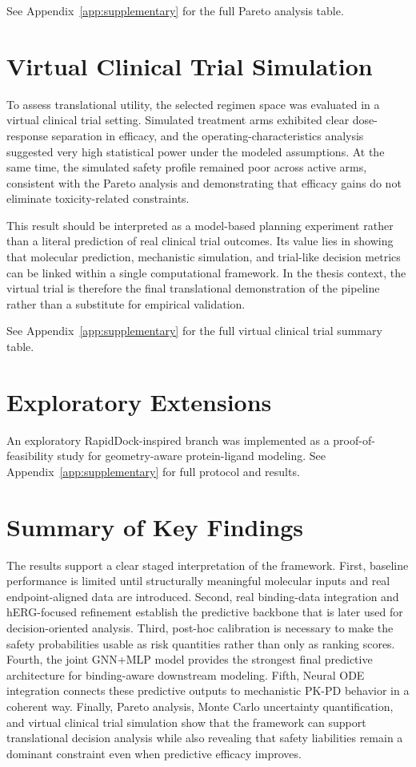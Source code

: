 \documentclass[a4paper,11pt,twoside]{report}
\begin{document}
See Appendix~\ref{app:supplementary} for the full Pareto analysis table.

\section{Virtual Clinical Trial Simulation}

To assess translational utility, the selected regimen space was evaluated in a virtual clinical trial setting. Simulated treatment arms exhibited clear dose-response separation in efficacy, and the operating-characteristics analysis suggested very high statistical power under the modeled assumptions. At the same time, the simulated safety profile remained poor across active arms, consistent with the Pareto analysis and demonstrating that efficacy gains do not eliminate toxicity-related constraints.

This result should be interpreted as a model-based planning experiment rather than a literal prediction of real clinical trial outcomes. Its value lies in showing that molecular prediction, mechanistic simulation, and trial-like decision metrics can be linked within a single computational framework. In the thesis context, the virtual trial is therefore the final translational demonstration of the pipeline rather than a substitute for empirical validation.


See Appendix~\ref{app:supplementary} for the full virtual clinical trial summary table.

\section{Exploratory Extensions}


An exploratory RapidDock-inspired branch was implemented as a proof-of-feasibility study for geometry-aware protein-ligand modeling. See Appendix~\ref{app:supplementary} for full protocol and results.

\section{Summary of Key Findings}

The results support a clear staged interpretation of the framework. First, baseline performance is limited until structurally meaningful molecular inputs and real endpoint-aligned data are introduced. Second, real binding-data integration and hERG-focused refinement establish the predictive backbone that is later used for decision-oriented analysis. Third, post-hoc calibration is necessary to make the safety probabilities usable as risk quantities rather than only as ranking scores. Fourth, the joint GNN+MLP model provides the strongest final predictive architecture for binding-aware downstream modeling. Fifth, Neural ODE integration connects these predictive outputs to mechanistic PK-PD behavior in a coherent way. Finally, Pareto analysis, Monte Carlo uncertainty quantification, and virtual clinical trial simulation show that the framework can support translational decision analysis while also revealing that safety liabilities remain a dominant constraint even when predictive efficacy improves.
\end{document}
